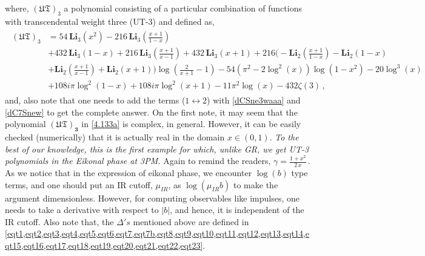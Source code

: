 \noindent

where, $\boldsymbol{\mathfrak{(UT)}}_3$ a polynomial consisting of a particular combination of functions with transcendental weight three (UT-3) and defined as,
\begin{align}
    \begin{split}
\boldsymbol{\mathfrak{(UT)}}_3&=54\,\textbf{Li}_3\left(x^2\right)-216\, \textbf{Li}_3\left(\frac{x+1}{1-x}\right)
\\ &+432\, \textbf{Li}_3(1-x)+216\, \textbf{Li}_3\left(\frac{x+1}{x-1}\right)+432\, \textbf{Li}_3(x+1)+216 \Big(-\textbf{Li}_2\left(\frac{x+1}{1-x}\right)-\textbf{Li}_2(1-x)\\ &+\textbf{Li}_2\left(\frac{x+1}{x-1}\right)+\textbf{Li}_2(x+1)\Big) \log \left(\frac{2}{x+1}-1\right)-54 \left(\pi ^2-2 \log ^2(x)\right) \log \left(1-x^2\right)-20 \log ^3(x)\\ &+108 i \pi  \log ^2(1-x)+108 i \pi  \log ^2(x+1)-11 \pi ^2 \log (x)-432 \zeta (3)\label{4.133a}\,,
    \end{split}
\end{align}
and, also note that one needs to add the terms ($1\leftrightarrow 2$) with \eqref{dCSne3waaa} and \eqref{dC7Snew} to get the complete answer.
On the first note,  it may seem that the polynomial $\boldsymbol{\mathfrak{(UT)}_3}$ in \eqref{4.133a} is complex, in general. However, it can be easily checked (numerically) that it is actually real in the domain $x\in(0,1)$. \textit{To the best of our knowledge, this is the first example for which, unlike GR, we get UT-3 polynomials in the Eikonal phase at 3PM.} 
Again to remind the readers, $\gamma=\frac{1+x^2}{2\,x}\,.$ As we notice that in the expression of eikonal phase, we encounter $\log(b)$ type terms, and one should put an IR cutoff, $\mu_{IR}$, as $\log(\mu_{IR}b)$ to make the argument dimensionless. However, for computing observables like impulses, one needs to take a derivative with respect to $|b|$, and hence, it is independent of the IR cutoff. Also note that, the $\Delta's$ mentioned above are defined in \cref{eqt1,eqt2,eqt3,eqt4,eqt5,eqt6,eqt7,eqt7b,eqt8,eqt9,eqt10,eqt11,eqt12,eqt13,eqt14,eqt15,eqt16,eqt17,eqt18,eqt19,eqt20,eqt21,eqt22,eqt23}.
  
